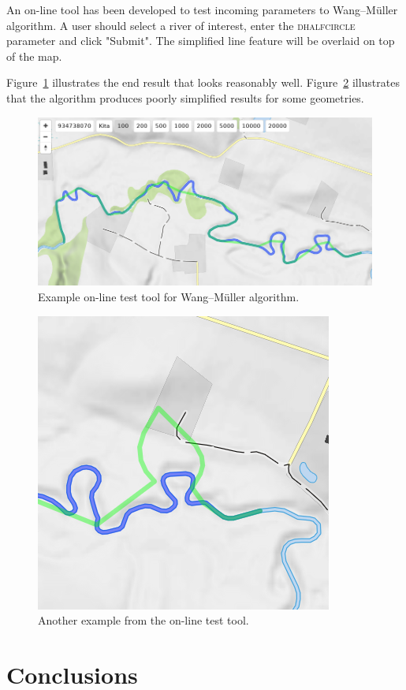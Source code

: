 \documentclass[a4paper]{article}
\newcommand{\WM}{Wang--M{\"u}ller}
\begin{document}
An on-line tool\cite{openmapwm} has been developed to test incoming parameters
to {\WM} algorithm. A user should select a river of interest, enter the
\textsc{dhalfcircle} parameter and click "Submit". The simplified line feature
will be overlaid on top of the map.

Figure~\ref{fig:openmap-wm-good} illustrates the end result that looks
reasonably well. Figure~\ref{fig:openmap-wm-bad} illustrates that the algorithm
produces poorly simplified results for some geometries.

\begin{figure}[ht]
    \centering
    \includegraphics[width=\textwidth]{openmap-wm-good.png}
    \caption{Example on-line test tool for {\WM} algorithm.}
    \label{fig:openmap-wm-good}
\end{figure}

\begin{figure}[ht]
    \centering
    \includegraphics[width=.5\textwidth]{openmap-wm-bad.png}
    \caption{Another example from the on-line test tool.}
    \label{fig:openmap-wm-bad}
\end{figure}

\section{Conclusions}
\label{sec:conclusions}
\end{document}
